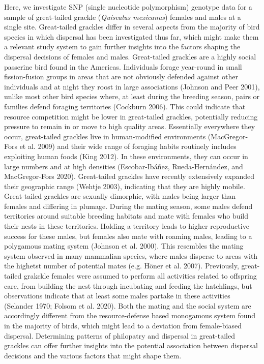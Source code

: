 \documentclass[]{article}
\begin{document}
Here, we investigate SNP (single nucleotide polymorphism) genotype data
for a sample of great-tailed grackle (\emph{Quiscalus mexicanus})
females and males at a single site. Great-tailed grackles differ in
several aspects from the majority of bird species in which dispersal has
been investigated thus far, which might make them a relevant study
system to gain further insights into the factors shaping the dispersal
decisions of females and males. Great-tailed grackles are a highly
social passerine bird found in the Americas. Individuals forage
year-round in small fission-fusion groups in areas that are not
obviously defended against other individuals and at night they roost in
large associations (Johnson and Peer 2001), unlike most other bird
species where, at least during the breeding season, pairs or families
defend foraging territories (Cockburn 2006). This could indicate that
resource competition might be lower in great-tailed grackles,
potentially reducing pressure to remain in or move to high quality
areas. Essentially everywhere they occur, great-tailed grackles live in
human-modified environments (MacGregor-Fors et al. 2009) and their wide
range of foraging habits routinely includes exploiting human foods (King
2012). In these environments, they can occur in large numbers and at
high densities (Escobar-Ibáñez, Rueda-Hernández, and MacGregor-Fors
2020). Great-tailed grackles have recently extensively expanded their
geographic range (Wehtje 2003), indicating that they are highly mobile.
Great-tailed grackles are sexually dimorphic, with males being larger
than females and differing in plumage. During the mating season, some
males defend territories around suitable breeding habitats and mate with
females who build their nests in these territories. Holding a territory
leads to higher reproductive success for these males, but females also
mate with roaming males, leading to a polygamous mating system (Johnson
et al. 2000). This resembles the mating system observed in many
mammalian species, where males disperse to areas with the highetst
number of potential mates (e.g. Höner et al. 2007). Previously,
great-tailed grakckle females were assumed to perform all activities
related to offspring care, from building the nest through incubating and
feeding the hatchlings, but observations indicate that at least some
males partake in these activities (Selander 1970; Folsom et al. 2020).
Both the mating and the social system are accordingly different from the
resource-defense based monogamous system found in the majority of birds,
which might lead to a deviation from female-biased dispersal.
Determining patterns of philopatry and dispersal in great-tailed
grackles can offer further insights into the potential association
between dispersal decisions and the various factors that might shape
them.
\end{document}
